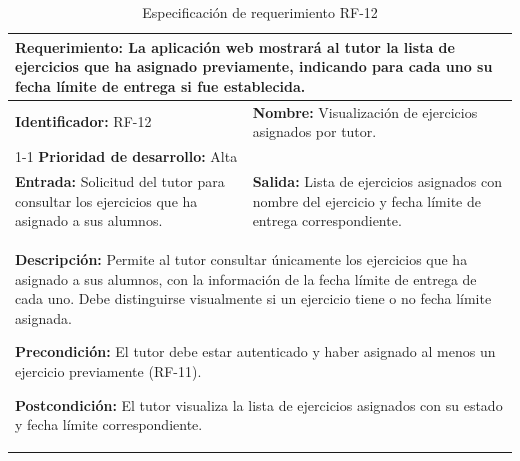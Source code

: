 \begin{table}[H]
\caption{Especificación de requerimiento RF-12}
\centering
\renewcommand{\arraystretch}{1.3}
\setlength{\tabcolsep}{6pt}
\begin{tabular}{|p{7cm}|p{8cm}|}
\hline
\multicolumn{2}{|p{15cm}|}{\textbf{Requerimiento:} La aplicación web mostrará al tutor la lista de ejercicios que ha asignado previamente, indicando para cada uno su fecha límite de entrega si fue establecida.} \\ \hline
\textbf{Identificador:} RF-12 &
\textbf{Nombre:} Visualización de ejercicios asignados por tutor. \\ \cline{1-1}
\textbf{Prioridad de desarrollo:} Alta &
\multicolumn{1}{p{8cm}|}{} \\ \hline
\textbf{Entrada:} Solicitud del tutor para consultar los ejercicios que ha asignado a sus alumnos. &
\textbf{Salida:} Lista de ejercicios asignados con nombre del ejercicio y fecha límite de entrega correspondiente. \\ \hline
\multicolumn{2}{|p{15cm}|}{
\textbf{Descripción:} Permite al tutor consultar únicamente los ejercicios que ha asignado a sus alumnos, con la información de la fecha límite de entrega de cada uno. Debe distinguirse visualmente si un ejercicio tiene o no fecha límite asignada.

\vspace{0.2cm}
\textbf{Precondición:} El tutor debe estar autenticado y haber asignado al menos un ejercicio previamente (RF-11).

\vspace{0.2cm}
\textbf{Postcondición:} El tutor visualiza la lista de ejercicios asignados con su estado y fecha límite correspondiente.
} \\ \hline
\end{tabular}
\label{tab:rf12}
\end{table}


